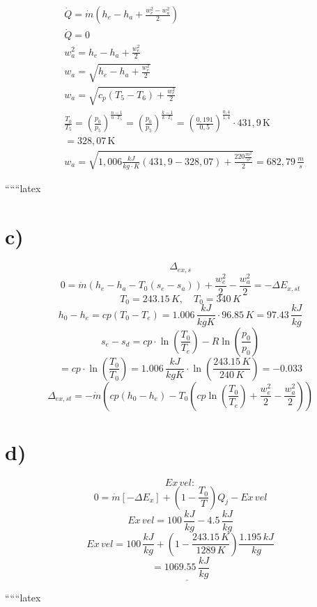 \begin{align*}
&\dot{Q} = \dot{m} \left( h_e - h_a + \frac{w_e^2 - w_a^2}{2} \right) \\
&\dot{Q} = 0 \\
&w_a^2 = h_e - h_a + \frac{w_e^2}{2} \\
&w_a = \sqrt{h_e - h_a + \frac{w_e^2}{2}} \\
&w_a = \sqrt{c_p (T_5 - T_6) + \frac{w_e^2}{2}} \\
&\frac{T_0}{T_5} = \left( \frac{p_0}{p_5} \right)^{\frac{n-1}{n \cdot T_5}} = \left( \frac{p_0}{p_5} \right)^{\frac{k-1}{k \cdot T_5}} = \left( \frac{0,191}{0,5} \right)^{\frac{0,4}{1,4}} \cdot 431,9 \, \text{K} \\
&= 328,07 \, \text{K} \\
&w_a = \sqrt{1,006 \frac{kJ}{kg \cdot K} (431,9 - 328,07) + \frac{220 \frac{m^2}{s^2}}{2}} = 682,79 \, \frac{m}{s}
\end{align*}

``````latex


\section*{c)}
\[
\Delta_{ex,s}
\]
\[
0 = \dot{m} \left( h_e - h_a - T_0 (s_e - s_a) \right) + \frac{w_e^2}{2} - \frac{w_a^2}{2} = -\Delta E_{x,st}
\]
\[
T_0 = 243.15 \, K, \quad T_0 = 340 \, K
\]
\[
h_0 - h_e = cp \left( T_0 - T_e \right) = 1.006 \, \frac{kJ}{kgK} \cdot 96.85 \, K = 97.43 \, \frac{kJ}{kg}
\]
\[
s_e - s_d = cp \cdot \ln \left( \frac{T_0}{T_e} \right) - R \ln \left( \frac{p_0}{p_0} \right)
\]
\[
= cp \cdot \ln \left( \frac{T_0}{T_0} \right) = 1.006 \, \frac{kJ}{kgK} \cdot \ln \left( \frac{243.15 \, K}{240 \, K} \right) = -0.033
\]
\[
\Delta_{ex,st} = -\dot{m} \left( cp (h_0 - h_e) - T_0 \left( cp \ln \left( \frac{T_0}{T_e} \right) + \frac{w_e^2}{2} - \frac{w_a^2}{2} \right) \right)
\]

\section*{d)}
\[
Ex \, vel:
\]
\[
0 = \dot{m} \left[ -\Delta E_x \right] + \left( 1 - \frac{T_0}{T} \right) Q_j - Ex \, vel
\]
\[
Ex \, vel = 100 \, \frac{kJ}{kg} - 4.5 \, \frac{kJ}{kg}
\]
\[
Ex \, vel = 100 \, \frac{kJ}{kg} + \left( 1 - \frac{243.15 \, K}{1289 \, K} \right) \frac{1.195 \, kJ}{kg}
\]
\[
= \underline{1069.55 \, \frac{kJ}{kg}}
\]

``````latex


